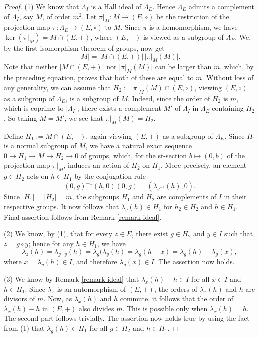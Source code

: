 \documentclass[11pt]{amsart}
\theoremstyle{thrm}
\theoremstyle{plain}
\theoremstyle{definition}
\numberwithin{equation}{section}
\begin{document}
\begin{proof}
(1) We know that $\Lambda_I$ is a Hall ideal of $\Lambda_E$. Hence $\Lambda_E$ admits a complement of $\Lambda_I$, say $M$, of order $m^2$.  Let $\pi|_M : M \to (E, \circ)$ be the restriction of the projection map $\pi  : \Lambda_E \to (E, \circ)$ to $M$.  Since $\pi$ is a homomorphism, we have  $\ker(\pi|_M) = M \cap (E,+)$, where $(E, +)$ is viewed as a subgroup of $\Lambda_E$. We, by the first isomorphism theorem of groups, now get
	\[
	|M| = |M \cap (E,+)| \, |\pi|_M(M)|.
	\]
Note that neither $|M \cap (E,+)|$ nor $|\pi|_M(M)|$ can be larger than $m$, which, by the preceding equation,  proves that both of these are equal to $m$. Without loss of any generality, we can assume that $H_2 :=  \pi|_M(M) \cap (E, \circ)$, viewing $(E, \circ)$ as a subgroup of $\Lambda_E$, is a subgroup of  $M$. Indeed, since the order of $H_2$ is $m$, which is coprime to $|\Lambda_I|$, there exists a complement $M'$ of $\Lambda_I$ in $\Lambda_E$ containing $H_2$. So taking $M = M'$, we see that $\pi|_M(M) = H_2$.

Define  $H_1 := M \cap (E,+)$, again viewing $(E, +)$ as a subgroup of $\Lambda_E$.
Since $H_1$ is a normal subgroup of $M$,  we have a natural  exact  sequence $0 \to H_1 \to M \to H_2 \to 0$ of groups, which, for the st-section $b \mapsto (0, b)$ of the projection map $\pi|_M$,  induces  an action of $H_2$ on $H_1$. More precisely, an element $g \in H_2$ acts on  $h \in H_1$ by the conjugation rule 
$$(0, g)^{-1} (h, 0) (0, g) = (\lambda_{g^{-1}}(h), 0).$$
Since $|H_1| = |H_2| = m$, the subgroups $H_1$ and $H_2$ are complements of $I$ in their respective groups. It now  follows that $\lambda_g(h) \in H_1$ for $h_2 \in H_2$ and $h \in H_1$.
Final assertion follows from Remark \ref{remark-ideal}.

(2)  We know, by (1), that for every $z \in E$, there exist $g \in H_2$ and $y \in I$ such that $z=g \circ y$; hence for any $h \in H_1$, we have
 $$\lambda_{z}(h)=	\lambda_{g \circ y}(h ) = \lambda_g(\lambda_y(h) = \lambda_g(h+x) = \lambda_g(h) + \lambda_g(x),$$
 where $x =  \lambda_y(h) \in I$, and therefore $\lambda_g(x) \in I$. The assertion now holds.

 
 (3)  We know by Remark \ref{remark-ideal} that  $\lambda_x(h) - h \in I$ for all $x \in I$ and $h \in H_1$. Since $\lambda_x$ is an automorphism of $(E, +)$,  the orders of $\lambda_x(h)$ and $h$ are divisors of $m$.  Now, as $\lambda_x(h)$ and $h$ commute, it follows that the order of $\lambda_x(h) - h$ in $(E, +)$ also divides $m$. This is possible only when $\lambda_x(h) = h$. The second part  follows trivially. The assertion now holds true by using the fact from (1) that $\lambda_g(h) \in H_1$ for all $g \in H_2$ and $h \in H_1$.
 

\end{proof}
\end{document}
